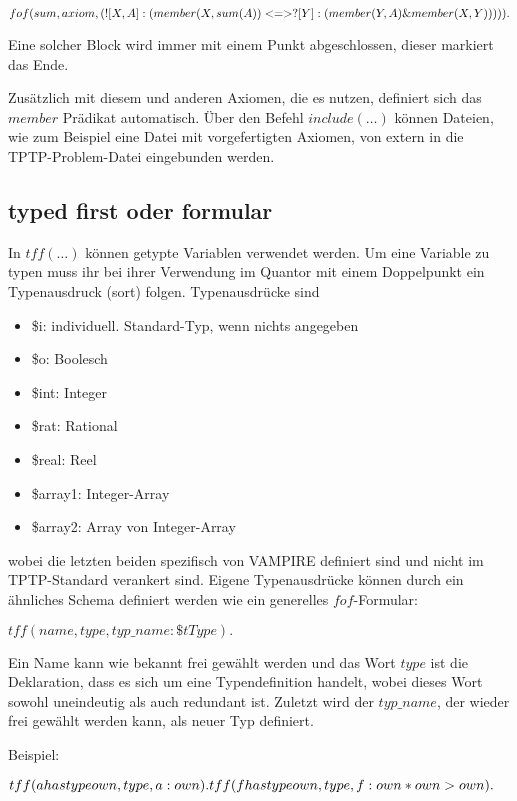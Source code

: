 \documentclass{article}
\begin{document}
$fof(sum, axiom, (\\! [X,A] :( member(X,sum(A)) \\<=> ? [Y] : ( member(Y,A)  \&  member(X,Y))))).$

Eine solcher Block wird immer mit einem Punkt abgeschlossen, dieser markiert das Ende.

Zusätzlich mit diesem und anderen Axiomen, die es nutzen, definiert sich das $member$ Prädikat automatisch.
Über den Befehl $include(\dots)$ können Dateien, wie zum Beispiel eine Datei mit vorgefertigten Axiomen, von extern in die TPTP-Problem-Datei eingebunden werden.

\subsection{typed first oder formular}
\label{subsec:tptptff}

In $tff(\dots)$ können getypte Variablen verwendet werden. Um eine Variable zu typen muss ihr bei ihrer Verwendung im Quantor mit einem Doppelpunkt ein Typenausdruck (sort) folgen.
Typenausdrücke sind \begin{itemize}
	\item \$i: individuell. Standard-Typ, wenn nichts angegeben
	\item \$o: Boolesch
	\item \$int: Integer
	\item \$rat: Rational
	\item \$real: Reel
	\item \$array1: Integer-Array
	\item \$array2: Array von Integer-Array
\end{itemize}
wobei die letzten beiden spezifisch von VAMPIRE definiert sind und nicht im TPTP-Standard verankert sind.
Eigene Typenausdrücke können durch ein ähnliches Schema definiert werden wie ein generelles $fof$-Formular:

$tff(name, type, typ\_name: \$tType).$

Ein Name kann wie bekannt frei gewählt werden und das Wort $type$ ist die Deklaration, dass es sich um eine Typendefinition handelt, wobei dieses Wort sowohl uneindeutig als auch redundant ist.
Zuletzt wird der $typ\_name$, der wieder frei gewählt werden kann, als neuer Typ definiert.

Beispiel:

$tff(a has type own,type,a : own).\\
tff(f has type own,type,f : own * own > own).$
\end{document}
